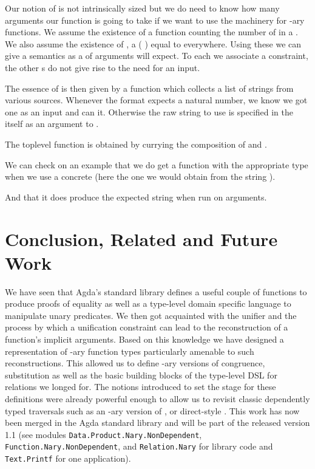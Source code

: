 {Our notion of  is not intrinsically sized but we do need to know
how many arguments our  function is going to take if we want to use
the machinery for -ary functions. We assume the existence of a 
function counting the number of  in a . We also assume the
existence of , a ( ) equal to  everywhere. Using
these we can give  a semantics as a  of arguments 
will expect. To each  we associate a  constraint, the other
s do not give rise to the need for an input.


The essence of  is then given by a function  which
collects a list of strings from various sources. Whenever the format expects
a natural number, we know we got one as an input and can  it.
Otherwise the raw string to use is specified in the  itself as
an argument to .


The toplevel function is obtained by currying the composition of
 and .


We can check on an example that we do get a function with the appropriate
type when we use a concrete  (here the one we would obtain from
the string ).


And that it does produce the expected string when run on arguments.


\section{Conclusion, Related and Future Work}

We have seen that Agda's standard library defines a useful couple of functions
to produce proofs of equality as well as a type-level domain specific language
to manipulate unary predicates. We then got acquainted with the unifier and the
process by which a unification constraint can lead to the reconstruction of a
function's implicit arguments. Based on this knowledge we have designed a
representation of -ary function types particularly amenable to such
reconstructions. This allowed us to define -ary versions of congruence,
substitution as well as the basic building blocks of the type-level DSL for
relations we longed for. The notions introduced to set the stage for these
definitions were already powerful enough to allow us to revisit classic
dependently typed traversals such as an -ary version of ,
or direct-style .
This work has now been merged in the Agda standard library and will be
part of the released version 1.1 (see modules \texttt{Data.Product.Nary.NonDependent},
\texttt{Function.Nary.NonDependent}, and \texttt{Relation.Nary} for
library code and \texttt{Text.Printf} for one application).

}
